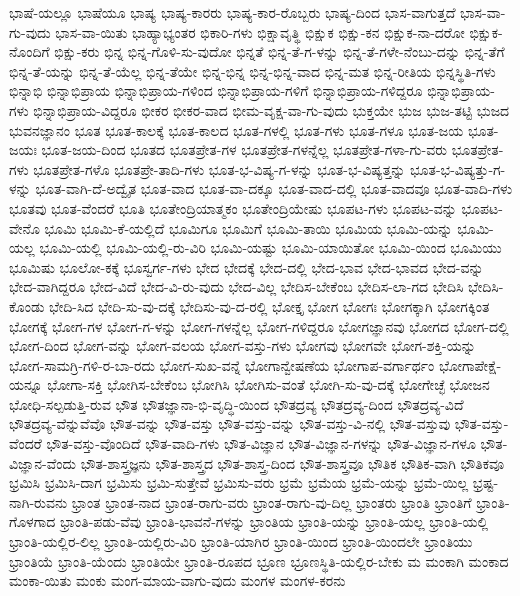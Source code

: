{ಭಾಷೆ-ಯಲ್ಲೂ
ಭಾಷೆಯೂ
ಭಾಷ್ಯ
ಭಾಷ್ಯ-ಕಾರರು
ಭಾಷ್ಯ-ಕಾರ-ರೊಬ್ಬರು
ಭಾಷ್ಯ-ದಿಂದ
ಭಾಸ-ವಾಗುತ್ತದೆ
ಭಾಸ-ವಾ-ಗು-ವುದು
ಭಾಸ-ವಾ-ಯಿತು
ಭಾಹ್ಯಾಭ್ಯಂತರ
ಭಿಕಾರಿ-ಗಳು
ಭಿಕ್ಷಾವೃತ್ಥಿ
ಭಿಕ್ಷುಕ
ಭಿಕ್ಷು-ಕನ
ಭಿಕ್ಷುಕ-ನಾ-ದರೋ
ಭಿಕ್ಷುಕ-ನೊಂದಿಗೆ
ಭಿಕ್ಷು-ಕರು
ಭಿನ್ನ
ಭಿನ್ನ-ಗೊಳಿ-ಸು-ವುದೋ
ಭಿನ್ನತೆ
ಭಿನ್ನ-ತೆ-ಗ-ಳನ್ನು
ಭಿನ್ನ-ತೆ-ಗಳೇ-ನೆಂಬು-ದನ್ನು
ಭಿನ್ನ-ತೆಗೆ
ಭಿನ್ನ-ತೆ-ಯನ್ನು
ಭಿನ್ನ-ತೆ-ಯೆಲ್ಲ
ಭಿನ್ನ-ತೆಯೇ
ಭಿನ್ನ-ಭಿನ್ನ
ಭಿನ್ನ-ಭಿನ್ನ-ವಾದ
ಭಿನ್ನ-ಮತ
ಭಿನ್ನ-ರೀತಿಯ
ಭಿನ್ನಸ್ಥಿತಿ-ಗಳು
ಭಿನ್ನಾಭಿ
ಭಿನ್ನಾಭಿಪ್ರಾಯ
ಭಿನ್ನಾಭಿಪ್ರಾಯ-ಗಳಿಂದ
ಭಿನ್ನಾಭಿಪ್ರಾಯ-ಗಳಿಗೆ
ಭಿನ್ನಾಭಿಪ್ರಾಯ-ಗಳಿದ್ದರೂ
ಭಿನ್ನಾಭಿಪ್ರಾಯ-ಗಳು
ಭಿನ್ನಾಭಿಪ್ರಾಯ-ವಿದ್ದರೂ
ಭೀಕರ
ಭೀಕರ-ವಾದ
ಭೀಮ-ವೃಕ್ಷ-ವಾ-ಗು-ವುದು
ಭುಕ್ತಯೇ
ಭುಜ
ಭುಜ-ತಟ್ಟಿ
ಭುಜದ
ಭುವನಜ್ಞಾನಂ
ಭೂತ
ಭೂತ-ಕಾಲಕ್ಕೆ
ಭೂತ-ಕಾಲದ
ಭೂತ-ಗಳಲ್ಲಿ
ಭೂತ-ಗಳು
ಭೂತ-ಗಳೂ
ಭೂತ-ಜಯ
ಭೂತ-ಜಯಃ
ಭೂತ-ಜಯ-ದಿಂದ
ಭೂತದ
ಭೂತಪ್ರೇತ-ಗಳ
ಭೂತಪ್ರೇತ-ಗಳನ್ನೆಲ್ಲ
ಭೂತಪ್ರೇತ-ಗಳಾ-ಗು-ವರು
ಭೂತಪ್ರೇತ-ಗಳು
ಭೂತಪ್ರೇತ-ಗಳೊ
ಭೂತಪ್ರೇ-ತಾದಿ-ಗಳು
ಭೂತ-ಭ-ವಿಷ್ಯ-ಗ-ಳನ್ನು
ಭೂತ-ಭ-ವಿಷ್ಯತ್ತನ್ನು
ಭೂತ-ಭ-ವಿಷ್ಯತ್ತು-ಗ-ಳನ್ನು
ಭೂತ-ವಾಗಿ-ದೆ-ಅದ್ವೈತ
ಭೂತ-ವಾದ
ಭೂತ-ವಾ-ದಕ್ಕೂ
ಭೂತ-ವಾದ-ದಲ್ಲಿ
ಭೂತ-ವಾದವೂ
ಭೂತ-ವಾದಿ-ಗಳು
ಭೂತವು
ಭೂತ-ವೆಂದರೆ
ಭೂತಿ
ಭೂತೇಂದ್ರಿಯಾತ್ಮಕಂ
ಭೂತೇಂದ್ರಿಯೇಷು
ಭೂಪಟ-ಗಳು
ಭೂಪಟ-ವನ್ನು
ಭೂಪಟ-ವೇನೊ
ಭೂಮಿ
ಭೂಮಿ-ಕೆ-ಯಲ್ಲಿದೆ
ಭೂಮಿಗೂ
ಭೂಮಿಗೆ
ಭೂಮಿ-ತಾಯಿ
ಭೂಮಿಯ
ಭೂಮಿ-ಯನ್ನು
ಭೂಮಿ-ಯಲ್ಲ
ಭೂಮಿ-ಯಲ್ಲಿ
ಭೂಮಿ-ಯಲ್ಲಿ-ರು-ವಿರಿ
ಭೂಮಿ-ಯಷ್ಟು
ಭೂಮಿ-ಯಾಯಿತೋ
ಭೂಮಿ-ಯಿಂದ
ಭೂಮಿಯು
ಭೂಮಿಷು
ಭೂಲೋ-ಕಕ್ಕೆ
ಭೂಸ್ವರ್ಗ-ಗಳು
ಭೇದ
ಭೇದಕ್ಕೆ
ಭೇದ-ದಲ್ಲಿ
ಭೇದ-ಭಾವ
ಭೇದ-ಭಾವದ
ಭೇದ-ವನ್ನು
ಭೇದ-ವಾಗಿದ್ದರೂ
ಭೇದ-ವಿದೆ
ಭೇದ-ವಿ-ರು-ವುದು
ಭೇದ-ವಿಲ್ಲ
ಭೇದಿಸ-ಬೇಕೆಂಬ
ಭೇದಿಸ-ಲಾ-ಗದ
ಭೇದಿಸಿ
ಭೇದಿಸಿ-ಕೊಂಡು
ಭೇದಿ-ಸಿದ
ಭೇದಿ-ಸು-ವು-ದಕ್ಕೆ
ಭೇದಿಸು-ವು-ದ-ರಲ್ಲಿ
ಭೋಕ್ತೃ
ಭೋಗ
ಭೋಗಃ
ಭೋಗಕ್ಕಾಗಿ
ಭೋಗಕ್ಕಿಂತ
ಭೋಗಕ್ಕೆ
ಭೋಗ-ಗಳ
ಭೋಗ-ಗ-ಳನ್ನು
ಭೋಗ-ಗಳನ್ನೆಲ್ಲ
ಭೋಗ-ಗಳಿದ್ದರೂ
ಭೋಗಜ್ಞಾನವು
ಭೋಗದ
ಭೋಗ-ದಲ್ಲಿ
ಭೋಗ-ದಿಂದ
ಭೋಗ-ವನ್ನು
ಭೋಗ-ವಲಯ
ಭೋಗ-ವಸ್ತು-ಗಳು
ಭೋಗವು
ಭೋಗವೇ
ಭೋಗ-ಶಕ್ತಿ-ಯನ್ನು
ಭೋಗ-ಸಾಮಗ್ರಿ-ಗಳಿ-ರ-ಬಾ-ರದು
ಭೋಗ-ಸುಖ-ವನ್ನೆ
ಭೋಗಾನ್ವೇಷಣೆಯ
ಭೋಗಾಪ-ವರ್ಗಾರ್ಥಂ
ಭೋಗಾಪೇಕ್ಷೆ-ಯನ್ನೂ
ಭೋಗಾ-ಸಕ್ತಿ
ಭೋಗಿಸ-ಬೇಕೆಂಬ
ಭೋಗಿಸಿ
ಭೋಗಿಸು-ವಂತೆ
ಭೋಗಿ-ಸು-ವು-ದಕ್ಕೆ
ಭೋಗೇಚ್ಛೆ
ಭೋಜನ
ಭೋಧಿ-ಸಲ್ಪಡುತ್ತಿ-ರುವ
ಭೌತ
ಭೌತಜ್ಞಾನಾ-ಭಿ-ವೃದ್ಧಿ-ಯಿಂದ
ಭೌತದ್ರವ್ಯ
ಭೌತದ್ರವ್ಯ-ದಿಂದ
ಭೌತದ್ರವ್ಯ-ವಿದೆ
ಭೌತದ್ರವ್ಯ-ವೆನ್ನುವೆವೊ
ಭೌತ-ವನ್ನು
ಭೌತ-ವಸ್ತು
ಭೌತ-ವಸ್ತು-ವನ್ನು
ಭೌತ-ವಸ್ತು-ವಿ-ನಲ್ಲಿ
ಭೌತ-ವಸ್ತುವು
ಭೌತ-ವಸ್ತು-ವೆಂದರೆ
ಭೌತ-ವಸ್ತು-ವೊಂದಿದೆ
ಭೌತ-ವಾದಿ-ಗಳು
ಭೌತ-ವಿಜ್ಞಾನ
ಭೌತ-ವಿಜ್ಞಾನ-ಗಳನ್ನು
ಭೌತ-ವಿಜ್ಞಾನ-ಗಳೂ
ಭೌತ-ವಿಜ್ಞಾನ-ವೆಂದು
ಭೌತ-ಶಾಸ್ತ್ರಜ್ಞನು
ಭೌತ-ಶಾಸ್ತ್ರದ
ಭೌತ-ಶಾಸ್ತ್ರ-ದಿಂದ
ಭೌತ-ಶಾಸ್ತ್ರವೂ
ಭೌತಿಕ
ಭೌತಿಕ-ವಾಗಿ
ಭೌತಿಕವೂ
ಭ್ರಮಿಸಿ
ಭ್ರಮಿಸಿ-ದಾಗ
ಭ್ರಮಿಸು
ಭ್ರಮಿ-ಸುತ್ತೇವೆ
ಭ್ರಮಿಸು-ವರು
ಭ್ರಮೆ
ಭ್ರಮೆಯ
ಭ್ರಮೆ-ಯನ್ನು
ಭ್ರಮೆ-ಯಿಲ್ಲ
ಭ್ರಷ್ಟ-ನಾಗಿ-ರುವನು
ಭ್ರಾಂತ
ಭ್ರಾಂತ-ನಾದ
ಭ್ರಾಂತ-ರಾಗು-ವರು
ಭ್ರಾಂತ-ರಾಗು-ವು-ದಿಲ್ಲ
ಭ್ರಾಂತರು
ಭ್ರಾಂತಿ
ಭ್ರಾಂತಿಗೆ
ಭ್ರಾಂತಿ-ಗೊಳಗಾದ
ಭ್ರಾಂತಿ-ಪಡು-ವೆವು
ಭ್ರಾಂತಿ-ಭಾವನೆ-ಗಳನ್ನು
ಭ್ರಾಂತಿಯ
ಭ್ರಾಂತಿ-ಯನ್ನು
ಭ್ರಾಂತಿ-ಯಲ್ಲ
ಭ್ರಾಂತಿ-ಯಲ್ಲಿ
ಭ್ರಾಂತಿ-ಯಲ್ಲಿರ-ಲಿಲ್ಲ
ಭ್ರಾಂತಿ-ಯಲ್ಲಿರು-ವಿರಿ
ಭ್ರಾಂತಿ-ಯಾಗಿರ
ಭ್ರಾಂತಿ-ಯಿಂದ
ಭ್ರಾಂತಿ-ಯಿಂದಲೇ
ಭ್ರಾಂತಿಯು
ಭ್ರಾಂತಿಯೆ
ಭ್ರಾಂತಿ-ಯೆಂದು
ಭ್ರಾಂತಿಯೇ
ಭ್ರಾಂತಿ-ರೂಪದ
ಭ್ರೂಣ
ಭ್ರೂಣಸ್ಥಿತಿ-ಯಲ್ಲಿರ-ಬೇಕು
ಮ
ಮಂಕಾಗಿ
ಮಂಕಾದ
ಮಂಕಾ-ಯಿತು
ಮಂಕು
ಮಂಗ-ಮಾಯ-ವಾಗು-ವುದು
ಮಂಗಳ
ಮಂಗಳ-ಕರನು
}
